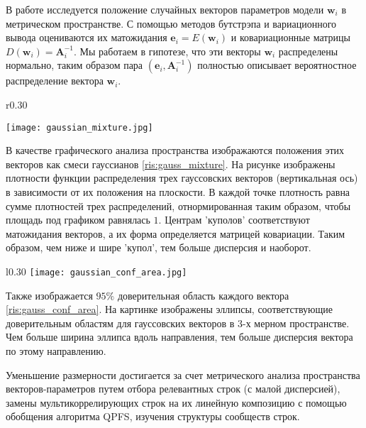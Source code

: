 \documentclass[12pt, twoside]{article}
\begin{document}

В работе исследуется положение случайных векторов параметров модели $\mathbf{w}_i$ в метрическом пространстве. С помощью методов бутстрэпа и вариационного вывода \citep{hastie2009elements} оцениваются их матожидания $\mathbf{e}_i=E(\mathbf{w}_i)$ и ковариационные матрицы $D(\mathbf{w}_i) = \mathbf{A}^{-1}_i$. Мы работаем в гипотезе, что эти векторы $\mathbf{w}_i$ распределены нормально, таким образом пара $(\mathbf{e}_i, \mathbf{A}^{-1}_i)$ полностью описывает вероятностное распределение вектора $\mathbf{w}_i$. 

\begin{wrapfigure}{r}{0.30\textwidth}

\texttt{[image: gaussian\_mixture.jpg]}
\caption{Смесь гауссианов трех 2-х мерных векторов.}
\label{ris:gauss_mixture}

\end{wrapfigure}
В качестве графического анализа пространства изображаются положения этих векторов как смеси гауссианов \ref{ris:gauss_mixture}.  На рисунке изображены плотности функции распределения трех гауссовских векторов (вертикальная ось) в зависимости от их положения на плоскости. В каждой точке плотность равна сумме плотностей трех распределений, отнормированная таким образом, чтобы площадь под графиком равнялась $1$. Центрам 'куполов' соответствуют матожидания векторов, а их форма определяется матрицей ковариации. Таким образом, чем ниже и шире 'купол', тем больше дисперсия и наоборот.

\begin{wrapfigure}{l}{0.30\textwidth}
\texttt{[image: gaussian\_conf\_area.jpg]}
\caption{Доверительные области 3-х мерных векторов.}
\label{ris:gauss_conf_area}
\end{wrapfigure}
Также изображается $95\%$ доверительная область каждого вектора \ref{ris:gauss_conf_area}. На картинке изображены эллипсы, соответствующие доверительным областям для гауссовских векторов в 3-х мерном пространстве. Чем больше ширина эллипса вдоль направления, тем больше дисперсия вектора по этому направлению.


Уменьшение размерности достигается за счет метрического анализа пространства векторов-параметров путем отбора релевантных строк (с малой дисперсией), замены мультикоррелирующих строк на их линейную композицию с помощью обобщения алгоритма QPFS, изучения структуры сообществ строк.
\end{document}
